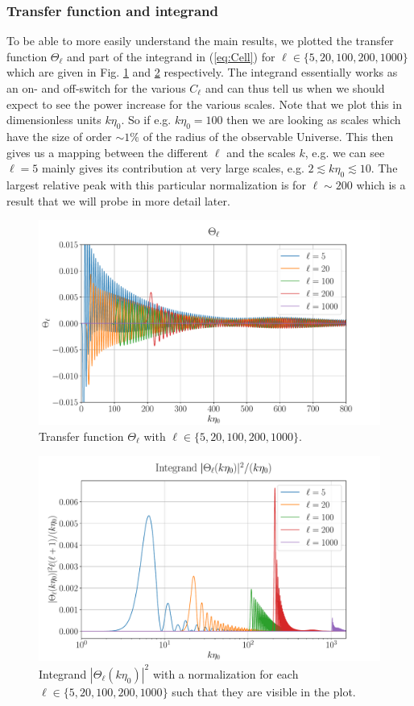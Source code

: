 \documentclass[%
reprint,
 amsmath,amssymb,
 aps,
]{revtex4-2}
\begin{document}
\subsubsection{Transfer function and integrand}
To be able to more easily understand the main results, we plotted the transfer function $\Theta_\ell$ and part of the integrand in (\ref{eq:Cell}) for $\ell\in\{5,20,100,200,1000\}$ which are given in Fig. \ref{fig:transfer} and \ref{fig:integrand} respectively. The integrand essentially works as an on- and off-switch for the various $C_\ell$ and can thus tell us when we should expect to see the power increase for the various scales. Note that we plot this in dimensionless units $k\eta_0$. So if e.g. $k\eta_0=100$ then we are looking as scales which have the size of order $\sim1\%$ of the radius of the observable Universe. This then gives us a mapping between the different $\ell$ and the scales $k$, e.g. we can see $\ell=5$ mainly gives its contribution at very large scales, e.g. $2\lesssim k\eta_0\lesssim10$. The largest relative peak with this particular normalization is for $\ell\sim200$ which is a result that we will probe in more detail later.
\begin{figure}[ht!]
	\includegraphics[width = \linewidth]{Figures/transfer.pdf}
	\caption{Transfer function $\Theta_\ell$ with $\ell\in\{5,20,100,200,1000\}$.}
	\label{fig:transfer}
\end{figure}
\begin{figure}[ht!]
	\includegraphics[width = \linewidth]{Figures/integrand.pdf}
	\caption{Integrand $|\Theta_\ell(k\eta_0)|^2$ with a normalization for each $\ell\in\{5,20,100,200,1000\}$ such that they are visible in the plot.}
	\label{fig:integrand}
\end{figure}
\end{document}
